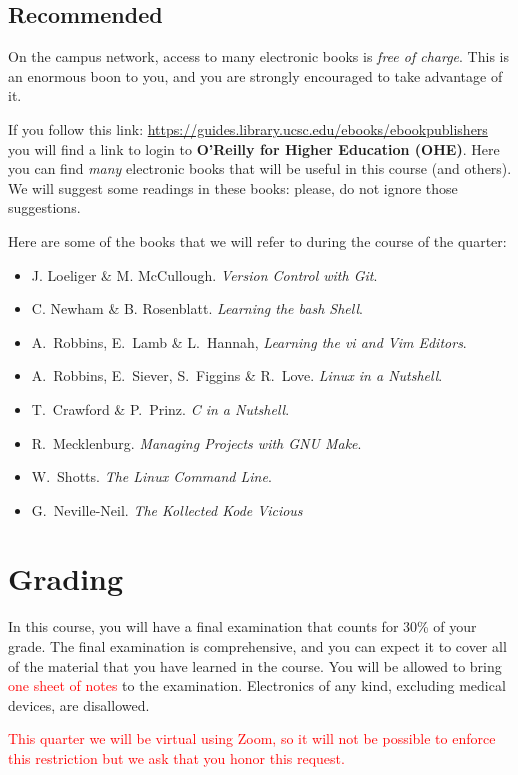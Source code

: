 \documentclass[12pt]{article}
\begin{document}
\subsection{Recommended}

On the campus network, access to many electronic books is \emph{free of
charge}. This is an enormous boon to you, and you are strongly
encouraged to take advantage of it.

If you follow this link:
\url{https://guides.library.ucsc.edu/ebooks/ebookpublishers} you will
find a link to login to \textbf{O'Reilly for Higher Education (OHE)}.
Here you can find \emph{many} electronic books that will be useful in
this course (and others). We will suggest some readings in these books:
please, do not ignore those suggestions.

Here are some of the books that we will refer to during the course of the
quarter:
\begin{itemize}
  \item J.\xspace Loeliger \& M.\xspace McCullough. \emph{Version Control with
    Git}.
  \item C.\xspace Newham \& B.\xspace Rosenblatt. \emph{Learning the bash
    Shell}.
  \item A.\ Robbins, E.\ Lamb \& L.\ Hannah, \emph{Learning the vi and Vim
    Editors}.
  \item A.\ Robbins, E.\ Siever, S.\ Figgins \& R.\ Love. \emph{Linux in a
    Nutshell}.
  \item T.\ Crawford \& P.\ Prinz. \emph{C in a Nutshell}.
  \item R.\ Mecklenburg. \emph{Managing Projects with GNU Make}.
  \item W.\ Shotts. \emph{The Linux Command Line}.
  \item G.\ Neville-Neil. \emph{The Kollected Kode Vicious}
\end{itemize}

\section{Grading}

In this course, you will have a final examination that counts for 30\%
of your grade. The final examination is comprehensive, and you can
expect it to cover all of the material that you have learned in the
course. You will be allowed to bring \textcolor{red}{one sheet of notes}
to the examination. Electronics of any kind, excluding medical devices,
are disallowed.

\textcolor{red}{This quarter we will be virtual using Zoom, so it will
not be possible to enforce this restriction but we ask that you honor
this request.}
\end{document}
